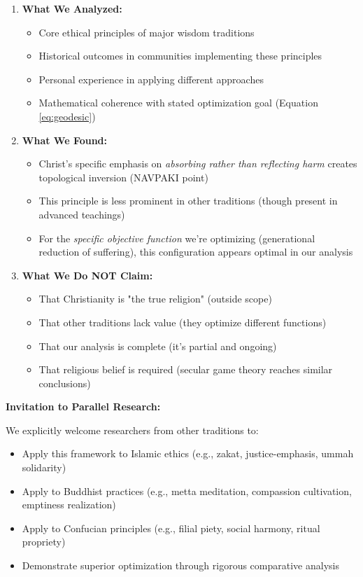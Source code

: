 \documentclass[11pt,a4paper]{article}
\theoremstyle{definition}
\theoremstyle{remark}
\begin{document}
\begin{enumerate}
\item \textbf{What We Analyzed:}
\begin{itemize}
\item Core ethical principles of major wisdom traditions
\item Historical outcomes in communities implementing these principles  
\item Personal experience in applying different approaches
\item Mathematical coherence with stated optimization goal (Equation \ref{eq:geodesic})
\end{itemize}

\item \textbf{What We Found:}
\begin{itemize}
\item Christ's specific emphasis on \textit{absorbing rather than reflecting harm} creates topological inversion (NAVPAKI point)
\item This principle is less prominent in other traditions (though present in advanced teachings)
\item For the \textit{specific objective function} we're optimizing (generational reduction of suffering), this configuration appears optimal in our analysis
\end{itemize}

\item \textbf{What We Do NOT Claim:}
\begin{itemize}
\item That Christianity is "the true religion" (outside scope)
\item That other traditions lack value (they optimize different functions)
\item That our analysis is complete (it's partial and ongoing)
\item That religious belief is required (secular game theory reaches similar conclusions)
\end{itemize}
\end{enumerate}

\textbf{Invitation to Parallel Research:}

We explicitly welcome researchers from other traditions to:
\begin{itemize}
\item Apply this framework to Islamic ethics (e.g., zakat, justice-emphasis, ummah solidarity)
\item Apply to Buddhist practices (e.g., metta meditation, compassion cultivation, emptiness realization)
\item Apply to Confucian principles (e.g., filial piety, social harmony, ritual propriety)
\item Demonstrate superior optimization through rigorous comparative analysis
\end{itemize}
\end{document}
